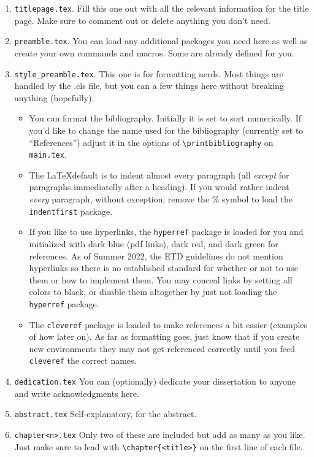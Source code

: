 \begin{enumerate}
\item \texttt{titlepage.tex}. Fill this one out with all the relevant information for the title page. Make sure to comment out or delete anything you don't need. 
\item \texttt{preamble.tex}. You can load any additional packages you need here as well as create your own commands and macros. Some are already defined for you. 
\item \texttt{style_preamble.tex}. This one is for formatting nerds. Most things are handled by the .cls file, but you can a few things here without breaking anything (hopefully). 
\begin{itemize}
\item You can format the bibliography. Initially it is set to sort numerically. If you'd like to change the name used for the bibliography (currently set to ``References'') adjust it in the options of \verb|\printbibliography| on \texttt{main.tex}.
\item The \LaTeX default is to indent almost every paragraph (all {\em except} for paragraphs immediatelly after a heading). If you would rather indent {\em every} paragraph, without exception, remove the \% symbol to load the \texttt{indentfirst} package.
\item If you like to use hyperlinks, the \texttt{hyperref} package is loaded for you and initialized with {\color{pdflinkcolor}dark blue} (pdf links), {\color{pdfcitecolor}dark red}, and {\color{pdfurlcolor}dark green} for references. As of Summer 2022, the ETD guidelines do not mention hyperlinks so there is no established standard for whether or not to use them or how to implement them. You may conceal links by setting all colors to black, or disable them altogether by just not loading the \texttt{hyperref} package.
\item The \texttt{cleveref} package is loaded to make references a bit easier (examples of how later on). As far as formatting goes, just know that if you create new environments they may not get referenced correctly until you feed \texttt{cleveref} the correct names.
\end{itemize}
\item \texttt{dedication.tex} You can (optionally) dedicate your dissertation to anyone and write acknowledgments here. 
\item \texttt{abstract.tex} Self-explanatory, for the abstract.
\item \texttt{chapter<n>.tex} Only two of these are included but add as many as you like. Just make sure to lead with \verb|\chapter{<title>}| on the first line of each file.

\end{enumerate}
